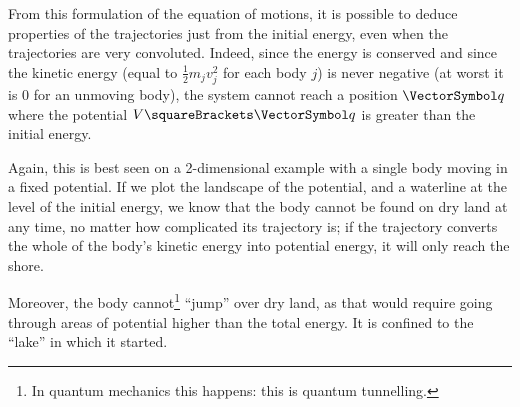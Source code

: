 \documentclass[10pt, a4paper, twoside]{basestyle}
\begin{document}
From this formulation of the equation of motions, it is possible to deduce
properties of the trajectories just from the initial energy, even when the
trajectories are very convoluted. Indeed, since the energy is conserved and
since the kinetic energy (equal to $\frac12 m_j v_j^2$ for each body $j$)
is never negative (at worst it is $0$ for an unmoving body), the system
cannot reach a position $\vq$ where the potential $V\of\vq$ is greater than the
initial energy.

Again, this is best seen on a 2-dimensional example with a single body moving
in a fixed potential. If we plot the landscape of the potential, and a waterline
at the level of the initial energy, we know that the body cannot be found on dry
land at any time, no matter how complicated its trajectory is; if the trajectory
converts the whole of the body's kinetic energy into potential energy, it will
only reach the shore.

Moreover, the body cannot\footnote{In quantum mechanics this happens: this is
quantum tunnelling.} ``jump'' over dry land, as that would require going through
areas of potential higher than the total energy. It is confined to the ``lake''
in which it started.
\end{document}
